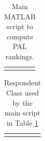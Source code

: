\documentclass[a4paper, 12pt]{article}
\begin{document}
\begin{table}[!htbp]
	\flushleft
	\begin{tabular}{|l|}\toprule
		\parbox[b]{6.25in}{}\\\bottomrule
	\end{tabular}
\caption{Main MATLAB script to compute PAL rankings.}
	\label{MAT1}
\end{table}

\begin{table}[!htpb]
	\flushleft
	\begin{tabular}{|l|}\toprule
		\parbox[b]{6.25in}{}\\\bottomrule
	\end{tabular}
	\caption{Respondent Class used by the main script in Table \ref{MAT1}}
		\label{MAT12}
	\end{table}





\newpage
\end{document}
